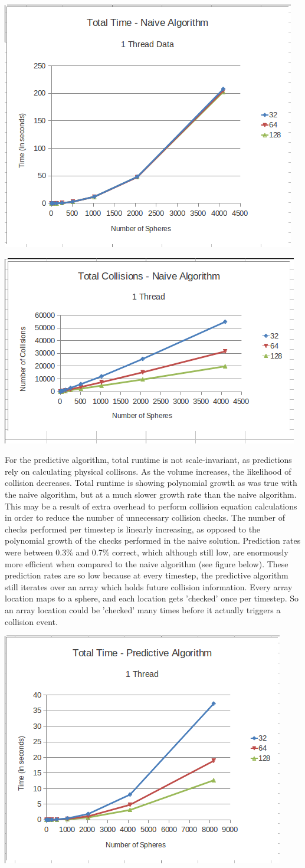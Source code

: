 \documentclass[conference]{IEEEtran}
\begin{document}
\begin{center}
	\includegraphics[width=.45\textwidth]{runtime_naive_1thread.png}
\end{center}

\begin{center}
	\includegraphics[width=.45\textwidth]{collisions_naive_1thread.png}
\end{center}

For the predictive algorithm, total runtime is not scale-invariant, as predictions rely on calculating physical collisons.  As the volume increases, the likelihood of collision decreases.  Total runtime is showing polynomial growth as was true with the naive algorithm, but at a much slower growth rate than the naive algorithm.  This may be a result of extra overhead to perform collision equation calculations in order to reduce the number of unnecessary collision checks.  The number of checks performed per timestep is linearly increasing, as opposed to the polynomial growth of the checks performed in the naive solution.  Prediction rates were between 0.3\% and 0.7\% correct, which although still low, are enormously more efficient when compared to the naive algorithm (see figure below).  These prediction rates are so low because at every timestep, the predictive algorithm still iterates over an array which holds future collision information.  Every array location maps to a sphere, and each location gets 'checked' once per timestep.  So an array location could be 'checked' many times before it actually triggers a collision event.

\begin{center}
	\includegraphics[width=.45\textwidth]{runtime_predictive_1thread.png}
\end{center}
\end{document}
